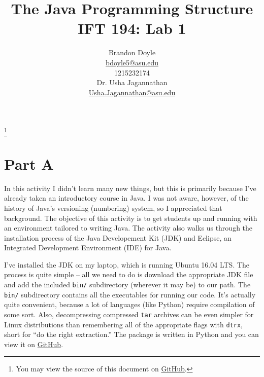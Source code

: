 \documentclass[leqno, 11pt]{article}
\title{\vspace{6ex}The Java Programming Structure\\
  \Large IFT 194: Lab 1}
\author{Brandon Doyle\\
\href{mailto:bdoyle@asu.edu}{bdoyle5\mbox{}{\fontfamily{ptm}\selectfont @}\mbox{}asu.edu}\\
1215232174\\[1em]
Dr. Usha Jagannathan\\
\href{mailto:Usha.Jagannathan@asu.edu}{Usha.Jagannathan\mbox{}{\fontfamily{ptm}\selectfont @}\mbox{}asu.edu}}
\newcommand\blfootnote[1]{%
  \begingroup
    \renewcommand\thefootnote{}\footnote{#1}
    \addtocounter{footnote}{-1}
  \endgroup
}
\begin{document}
\begin{titlepage}
\clearpage\maketitle
\thispagestyle{empty}
\end{titlepage}
\blfootnote{You may view the source of this document on \href{https://github.com/bjd2385/IFT_194_labs/blob/master/lab_1.tex}{GitHub}.}
\section*{Part A}
In this activity I didn't learn many new things, but this is primarily because I've already taken an introductory course in Java. I was not aware, however, of the history of Java's versioning (numbering) system, so I appreciated that background. The objective of this activity is to get students up and running with an environment tailored to writing Java. The activity also walks us through the installation process of the Java Developement Kit (JDK) and Eclipse, an Integrated Development Environment (IDE) for Java.

I've installed the JDK on my laptop, which is running Ubuntu 16.04 LTS. The process is quite simple -- all we need to do is download the appropriate JDK file and add the included \texttt{bin/} subdirectory (wherever it may be) to our path. The \texttt{bin/} subdirectory contains all the executables for running our code. It's actually quite convenient, because a lot of languages (like  Python) require compilation of some sort. Also, decompressing compressed \texttt{tar} archives can be even simpler for Linux distributions than remembering all of the appropriate flags with \texttt{dtrx}, short for ``do the right extraction.'' The package is written in Python and you can view it on \href{https://github.com/moonpyk/dtrx}{GitHub}.
\end{document}

